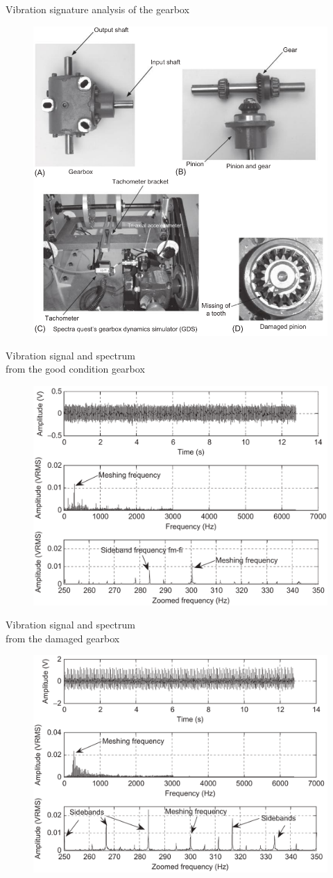 \documentclass[pdflatex,compress,mathserif]{beamer}
\begin{document}
\begin{frame}{Vibration signature analysis of the gearbox}
	\begin{figure}
		\includegraphics[width=0.5\linewidth]{img/img11}
	\end{figure}
\end{frame}

\begin{frame}{Vibration signal and spectrum\\from the good condition gearbox}
	\begin{figure}
		\includegraphics[width=0.8\linewidth]{img/img12}
	\end{figure}
\end{frame}

\begin{frame}{Vibration signal and spectrum\\from the damaged gearbox}
	\begin{figure}
		\includegraphics[width=0.8\linewidth]{img/img13}
	\end{figure}
\end{frame}
\end{document}
